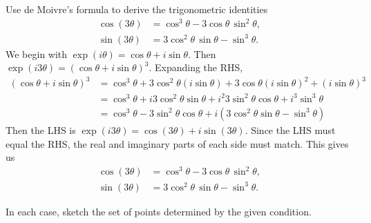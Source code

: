 \documentclass[11pt]{exam}
\DeclareMathOperator{\re}{Re}
\DeclareMathOperator{\im}{Im}
\begin{document}
\begin{questions}
\question Use de Moivre's formula to derive the trigonometric
identities
\begin{align*}
  \cos (3\theta) &= \cos^3 \theta - 3 \cos \theta \, \sin^2 \theta, \\
  \sin (3\theta) &= 3 \cos^2 \theta \, \sin \theta -  \sin^3 \theta.
\end{align*}
We begin with $\exp (i\theta) = \cos \theta + i \sin \theta$.
Then $\exp (i3\theta) = (\cos \theta + i \sin \theta)^3$.
Expanding the RHS,
\begin{align*}
    (\cos \theta + i \sin \theta)^3
    &= \cos ^3 \theta + 3 \cos ^2 \theta (i \sin \theta) + 3 \cos \theta (i \sin \theta)^2 + (i \sin \theta)^3 \\
    &= \cos ^3 \theta + i3 \cos ^2 \theta \sin \theta + i^2 3 \sin ^2 \theta \cos \theta + i^3 \sin ^3 \theta \\
    &= \cos ^3 \theta - 3 \sin ^2 \theta \cos \theta + i(3 \cos ^2 \theta \sin \theta - \sin ^3 \theta)
\end{align*}
Then the LHS is $\exp (i3\theta) = \cos (3 \theta) + i \sin (3 \theta)$.
Since the LHS must equal the RHS, the real and imaginary parts of each side must match.
This gives us
\begin{align*}
  \cos (3\theta) &= \cos^3 \theta - 3 \cos \theta \, \sin^2 \theta, \\
  \sin (3\theta) &= 3 \cos^2 \theta \, \sin \theta -  \sin^3 \theta.
\end{align*}

\question In each case, sketch the set of points determined by the
given condition.
\end{questions}
\end{document}

